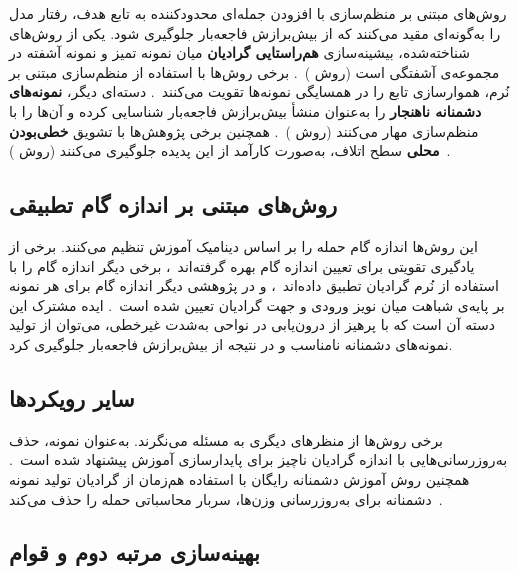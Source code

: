 \documentclass[11pt]{article}
\begin{document}
روش‌های مبتنی بر منظم‌سازی با افزودن جمله‌ای محدودکننده به تابع هدف،
رفتار مدل را به‌گونه‌ای مقید می‌کنند که از بیش‌برازش فاجعه‌بار جلوگیری شود.
یکی از روش‌های شناخته‌شده، بیشینه‌سازی \textbf{هم‌راستایی گرادیان}
میان نمونه‌ تمیز و نمونه‌ آشفته در مجموعه‌ی آشفتگی است (روش )~\cite{andriushchenko2020understanding}.
برخی روش‌ها با استفاده از منظم‌سازی مبتنی بر نُرم، هموارسازی تابع را در همسایگی نمونه‌ها تقویت می‌کنند~\cite{sriramanan2021towards}.
دسته‌ای دیگر، \textbf{نمونه‌های دشمنانه‌ ناهنجار} را به‌عنوان منشأ بیش‌برازش فاجعه‌بار شناسایی کرده
و آن‌ها را با منظم‌سازی مهار می‌کنند (روش )~\cite{lin2023eliminating}.
همچنین برخی پژوهش‌ها با تشویق \textbf{خطی‌بودن محلی} سطح اتلاف،
به‌صورت کارآمد از این پدیده جلوگیری می‌کنند (روش )~\cite{rocamora2024efficient}.

\subsection{روش‌های مبتنی بر اندازه‌ گام تطبیقی}

این روش‌ها اندازه‌ گام حمله را بر اساس دینامیک آموزش تنظیم می‌کنند.
برخی از یادگیری تقویتی برای تعیین اندازه‌ گام بهره گرفته‌اند~\cite{nie2021adaptive}،
برخی دیگر اندازه‌ گام را با استفاده از نُرم گرادیان تطبیق داده‌اند~\cite{huang2023fast}،
و در پژوهشی دیگر اندازه‌ گام برای هر نمونه بر پایه‌ی شباهت میان نویز ورودی و جهت گرادیان تعیین شده است~\cite{zhao2025avoiding}.
ایده‌ مشترک این دسته آن است که با پرهیز از درون‌یابی در نواحی به‌شدت غیرخطی،
می‌توان از تولید نمونه‌های دشمنانه‌ نامناسب و در نتیجه از بیش‌برازش فاجعه‌بار جلوگیری کرد.

\subsection{سایر رویکردها}

برخی روش‌ها از منظرهای دیگری به مسئله می‌نگرند.
به‌عنوان نمونه، حذف به‌روزرسانی‌هایی با اندازه‌ گرادیان ناچیز برای پایدارسازی آموزش پیشنهاد شده است~\cite{golgooni2023zerograd}.
همچنین روش آموزش دشمنانه‌ رایگان
با استفاده‌ هم‌زمان از گرادیان تولید نمونه‌ دشمنانه برای به‌روزرسانی وزن‌ها،
سربار محاسباتی حمله را حذف می‌کند~\cite{shafahi2019adversarial}.

\subsection{بهینه‌سازی مرتبه دوم و قوام}
\end{document}

